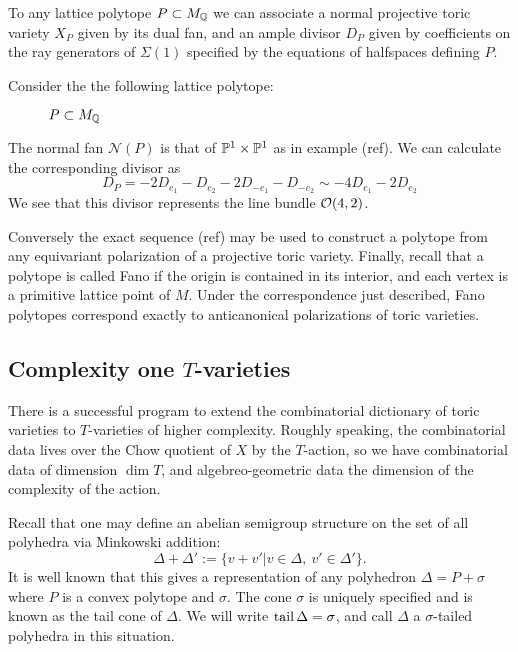 To any lattice polytope \(P \subset M_{\mathbb{Q}}\) we can associate a normal projective toric variety \(X_P\) given by its dual fan, and an ample divisor \(D_P\) given by coefficients on the ray generators of \(\Sigma(1)\) specified by the equations of halfspaces defining \(P\).
\begin{example}
Consider the the following lattice polytope:
\begin{figure}[h]
\centering
	\caption{$P \subset M_{\mathbb{Q}}$}
\end{figure}

The normal fan \(\mathcal{N}(P)\) is that of \(\mathbb{P}^1 \times \mathbb{P}^1\) as in example (ref). We can calculate the corresponding divisor as
\[
D_P = -2D_{e_1} - D_{e_2} -2 D_{-e_1} - D_{-e_2}  \sim -4 D_{e_1} -2 D_{e_2} 
\]
We see that this divisor represents the line bundle \(\mathcal{O}(4,2)\).
\end{example}
Conversely the exact sequence (ref) may be used to construct a polytope from any equivariant polarization of a projective toric variety. Finally, recall that a polytope is called Fano if the origin is contained in its interior, and each vertex is a primitive lattice point of \(M\). Under the correspondence just described, Fano polytopes correspond exactly to anticanonical polarizations of toric varieties.
\subsection{Complexity one $T$-varieties}
There is a successful program to extend the combinatorial dictionary of toric varieties to \(T\)-varieties of higher complexity. Roughly speaking, the combinatorial data lives over the Chow quotient of \(X\) by the \(T\)-action, so we have combinatorial data of dimension \(\dim T\), and algebreo-geometric data the dimension of the complexity of the action.

Recall that one may define an abelian semigroup structure on the set of all polyhedra via Minkowski addition:
\[
\Delta + \Delta' := \{ v + v' | v \in \Delta, \ v' \in \Delta' \}.
\]
It is well known that this gives a representation of any polyhedron \(\Delta = P + \sigma \) where \(P\) is a convex polytope and \(\sigma\). The cone \(\sigma\) is uniquely specified and is known as the tail cone of \(\Delta\). We will write \(\operatorname{tail} \Delta = \sigma\), and call \(\Delta\) a \(\sigma\)-tailed polyhedra in this situation.

